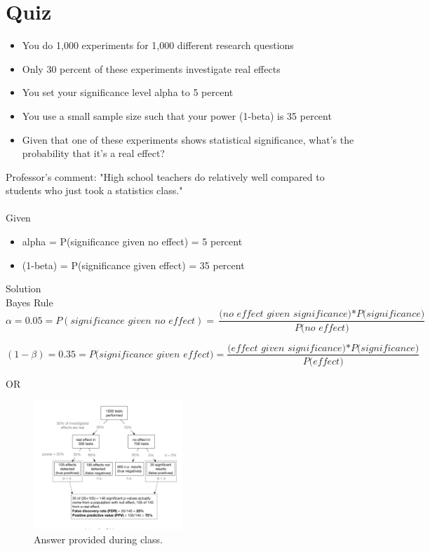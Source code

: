 

\section{Quiz}

\begin{itemize}
  \item You do 1,000 experiments for 1,000 different research questions
  \item Only 30 percent of these experiments investigate real effects
  \item You set your significance level alpha to 5 percent
  \item You use a small sample size such that your power (1-beta) is 35 percent
  \item Given that one of these experiments shows statistical significance, what's the probability that it's a real effect?\\
\end{itemize} 
Professor's comment: "High school teachers do relatively well compared to students who just took a statistics class."\\ \\
Given
\begin{itemize}
  \item alpha = P(significance given no effect) = 5 percent
  \item (1-beta) = P(significance given effect) = 35 percent\\
\end{itemize}
    
Solution\\
Bayes Rule\\
\begin{equation}
  \alpha=0.05=P(\textit{significance given no effect})=\frac{\textit{(no effect given significance)}*\textit{P(significance)}}{P\textit{(no effect)}}
\end{equation}

\begin{equation}
  (1-\beta)=0.35=P\textit{(significance given effect)}=\frac{\textit{(effect given significance)*P(significance)}}{P\textit{(effect)}}
\end{equation}

OR

\begin{figure}[ht]
  \begin{center}
    \includegraphics[width=0.5\textwidth]{figures/1.png}
    \caption{
      Answer provided during class.}
    \label{fig:example_figure}
  \end{center}
\end{figure}

